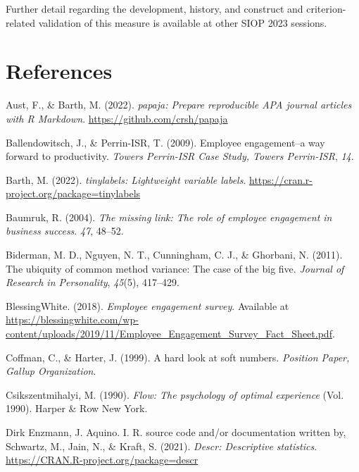 \documentclass[
  man]{apa6}
\newlength{\cslhangindent}
\newlength{\cslentryspacingunit} %
\newenvironment{CSLReferences}[2] %
 {%
  \setlength{\parindent}{0pt}
  \ifodd #1
  \let\oldpar\par
  \def\par{\hangindent=\cslhangindent\oldpar}
  \fi
  \setlength{\parskip}{#2\cslentryspacingunit}
 }%
 {}
\begin{document}
Further detail regarding the development, history, and construct and criterion-related validation of this measure is available at other SIOP 2023 sessions.

\newpage

\hypertarget{references}{%
\section{References}\label{references}}

\hypertarget{refs}{}
\begin{CSLReferences}{1}{0}
\leavevmode{}%
Aust, F., \& Barth, M. (2022). \emph{{papaja}: {Prepare} reproducible {APA} journal articles with {R Markdown}}. \url{https://github.com/crsh/papaja}

\leavevmode{}%
Ballendowitsch, J., \& Perrin-ISR, T. (2009). Employee engagement--a way forward to productivity. \emph{Towers Perrin-ISR Case Study, Towers Perrin-ISR}, \emph{14}.

\leavevmode{}%
Barth, M. (2022). \emph{{tinylabels}: Lightweight variable labels}. \url{https://cran.r-project.org/package=tinylabels}

\leavevmode{}%
Baumruk, R. (2004). \emph{The missing link: The role of employee engagement in business success}. \emph{47}, 48--52.

\leavevmode{}%
Biderman, M. D., Nguyen, N. T., Cunningham, C. J., \& Ghorbani, N. (2011). The ubiquity of common method variance: The case of the big five. \emph{Journal of Research in Personality}, \emph{45}(5), 417--429.

\leavevmode{}%
BlessingWhite. (2018). \emph{Employee engagement survey}. Available at \url{https://blessingwhite.com/wp-content/uploads/2019/11/Employee_Engagement_Survey_Fact_Sheet.pdf}.

\leavevmode{}%
Coffman, C., \& Harter, J. (1999). A hard look at soft numbers. \emph{Position Paper, Gallup Organization}.

\leavevmode{}%
Csikszentmihalyi, M. (1990). \emph{Flow: The psychology of optimal experience} (Vol. 1990). Harper \& Row New York.

\leavevmode{}%
Dirk Enzmann, J. Aquino. I. R. source code and/or documentation written by, Schwartz, M., Jain, N., \& Kraft, S. (2021). \emph{Descr: Descriptive statistics}. \url{https://CRAN.R-project.org/package=descr}


\end{CSLReferences}
\end{document}
